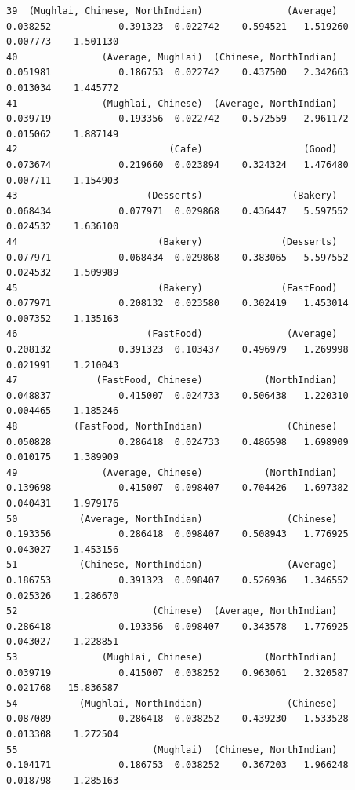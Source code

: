 \documentclass[11pt]{article} %
\begin{document}
\begin{lstlisting}
39  (Mughlai, Chinese, NorthIndian)               (Average)            0.038252            0.391323  0.022742    0.594521   1.519260  0.007773    1.501130
40               (Average, Mughlai)  (Chinese, NorthIndian)            0.051981            0.186753  0.022742    0.437500   2.342663  0.013034    1.445772
41               (Mughlai, Chinese)  (Average, NorthIndian)            0.039719            0.193356  0.022742    0.572559   2.961172  0.015062    1.887149
42                           (Cafe)                  (Good)            0.073674            0.219660  0.023894    0.324324   1.476480  0.007711    1.154903
43                       (Desserts)                (Bakery)            0.068434            0.077971  0.029868    0.436447   5.597552  0.024532    1.636100
44                         (Bakery)              (Desserts)            0.077971            0.068434  0.029868    0.383065   5.597552  0.024532    1.509989
45                         (Bakery)              (FastFood)            0.077971            0.208132  0.023580    0.302419   1.453014  0.007352    1.135163
46                       (FastFood)               (Average)            0.208132            0.391323  0.103437    0.496979   1.269998  0.021991    1.210043
47              (FastFood, Chinese)           (NorthIndian)            0.048837            0.415007  0.024733    0.506438   1.220310  0.004465    1.185246
48          (FastFood, NorthIndian)               (Chinese)            0.050828            0.286418  0.024733    0.486598   1.698909  0.010175    1.389909
49               (Average, Chinese)           (NorthIndian)            0.139698            0.415007  0.098407    0.704426   1.697382  0.040431    1.979176
50           (Average, NorthIndian)               (Chinese)            0.193356            0.286418  0.098407    0.508943   1.776925  0.043027    1.453156
51           (Chinese, NorthIndian)               (Average)            0.186753            0.391323  0.098407    0.526936   1.346552  0.025326    1.286670
52                        (Chinese)  (Average, NorthIndian)            0.286418            0.193356  0.098407    0.343578   1.776925  0.043027    1.228851
53               (Mughlai, Chinese)           (NorthIndian)            0.039719            0.415007  0.038252    0.963061   2.320587  0.021768   15.836587
54           (Mughlai, NorthIndian)               (Chinese)            0.087089            0.286418  0.038252    0.439230   1.533528  0.013308    1.272504
55                        (Mughlai)  (Chinese, NorthIndian)            0.104171            0.186753  0.038252    0.367203   1.966248  0.018798    1.285163

\end{lstlisting}
\end{document}
